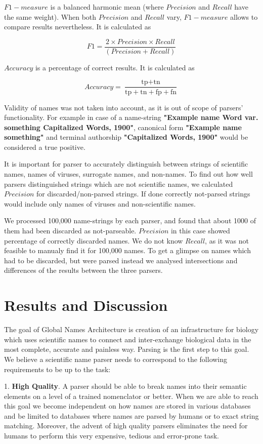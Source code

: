 \documentclass{bmcart}
\begin{document}
$F1-measure$ is a balanced harmonic mean (where $Precision$ and $Recall$ have
the same weight). When both $Precision$ and $Recall$ vary, $F1-measure$ allows
to compare results nevertheless. It is calculated as

\[F1 = \dfrac{2 \times Precision \times Recall}{(Precision + Recall)}\]

$Accuracy$ is a percentage of correct results. It is calculated as

\[Accuracy = \dfrac{\text{tp} + \text{tn}}
  {\text{tp} + \text{tn} + \text{fp} + \text{fn}}\]

Validity of names was not taken into account, as it is out of scope of
parsers' functionality. For example in case of a name-string \textbf{"Example
name Word var.  something Capitalized Words, 1900"}, canonical form
\textbf{"Example name something"} and terminal authorship \textbf{"Capitalized
Words, 1900"} would be considered a true positive.

It is important for parser to accurately distinguish between strings of
scientific names, names of viruses, surrogate names, and non-names. To find
out how well parsers distinguished strings which are not scientific names, we
calculated $Precision$ for discarded/non-parsed strings. If done correctly
not-parsed strings would include only names of viruses and non-scientific
names.

We processed 100,000 name-strings by each parser, and found that about 1000 of
them had been discarded as not-parseable. $Precision$ in this case showed
percentage of correctly discarded names.  We do not know $Recall$, as it was
not feasible to manualy find it for 100,000 names. To get a glimpse on names
which had to be discarded, but were parsed instead we analysed intersections
and differences of the results between the three parsers.

\section*{Results and Discussion}

The goal of Global Names Architecture is creation of an infrastructure for
biology which uses scientific names to connect and inter-exchange biological
data in the most complete, accurate and painless way. Parsing is the first
step to this goal. We believe a scientific name parser needs to correspond to
the following requirements to be up to the task:

1. \textbf{High Quality}. A parser should be able to break names into their
semantic elements on a level of a trained nomenclator or better. When we are
able to reach this goal we become independent on how names are stored in
various databases and be limited to databases where names are parsed by humans
or to exact string matching. Moreover, the advent of high quality parsers
eliminates the need for humans to perform this very expensive, tedious and
error-prone task.
\end{document}
